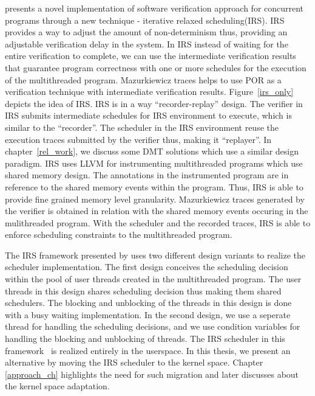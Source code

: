 \citet{metzler2017quick} presents a novel implementation of software verification approach for concurrent programs through a new technique - iterative relaxed scheduling(IRS). 
IRS provides a way to adjust the amount of non-determinism thus, providing an adjustable verification delay in the system. 
In IRS instead of waiting for the entire verification to complete, we can use the intermediate verification results that guarantee program correctness with one or more schedules for the execution of the multithreaded program. 
Mazurkiewicz traces helps to use POR as a verification technique with intermediate verification results. 
Figure~\ref{irs_only} depicts the idea of IRS. 
IRS is in a way ``recorder-replay'' design. 
The verifier in IRS submits intermediate schedules for IRS environment to execute, which is similar to the ``recorder''. 
The scheduler in the IRS environment reuse the execution traces submitted by the verifier thus, making it ``replayer''. 
In chapter~\ref{rel_work}, we discuss some DMT solutions which use a similar design paradigm.  
IRS uses LLVM for instrumenting multithreaded programs which use shared memory design. 
The annotations in the instrumented program are in reference to the shared memory events within the program. 
Thus, IRS is able to provide fine grained memory level granularity. 
Mazurkiewicz traces generated by the verifier is obtained in relation with the shared memory events occuring in the mulithreaded program. 
With the scheduler and the recorded traces, IRS is able to enforce scheduling constraints to the multithreaded program. 

The IRS framework presented by \citet{metzler2017quick} uses two different design variants to realize the scheduler implementation. 
The first design conceives the scheduling decision within the pool of user threads created in the multithreaded program. 
The user threads in this design shares scheduling decision thus making them shared schedulers. 
The blocking and unblocking of the threads in this design is done with a busy waiting implementation. 
In the second design, we use a seperate thread for handling the scheduling decisions, and we use condition variables for handling the blocking and unblocking of threads. 
The IRS scheduler in this framework~\citep{metzler2017quick} is realized entirely in the userspace. 
In this thesis, we present an alternative by moving the IRS scheduler to the kernel space. 
Chapter \ref{approach_ch} highlights the need for such migration and later discusses about the kernel space adaptation. 


